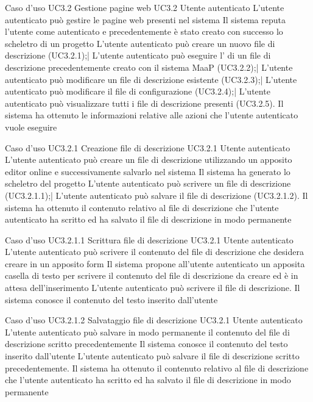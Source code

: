 \UCtitle
{Caso d'uso UC3.2}
{Gestione pagine web}
\UC
{UC3.2}
{Utente autenticato}
{L'utente autenticato può gestire le pagine web presenti nel sistema}
{Il sistema reputa l'utente come autenticato e precedentemente è stato creato con successo lo scheletro di un progetto}
\scenario
{L'utente autenticato può creare un nuovo file di descrizione (UC3.2.1);|
L'utente autenticato può eseguire l' di un file di descrizione precedentemente creato con il sistema MaaP (UC3.2.2);|
L'utente autenticato può modificare un file di descrizione esistente (UC3.2.3);|
L'utente autenticato può modificare il file di configurazione (UC3.2.4);|
L'utente autenticato può visualizzare tutti i file di descrizione presenti (UC3.2.5).
}
\post
{Il sistema ha ottenuto le informazioni relative alle azioni che l'utente autenticato vuole eseguire}


\UCtitle
{Caso d'uso UC3.2.1}
{Creazione file di descrizione}
\UC
{UC3.2.1}
{Utente autenticato}
{L'utente autenticato può creare un file di descrizione utilizzando un apposito editor online e successivamente salvarlo nel sistema}
{Il sistema ha generato lo scheletro del progetto}
\scenario
{L'utente autenticato può scrivere un file di descrizione (UC3.2.1.1);|
L'utente autenticato può salvare il file di descrizione (UC3.2.1.2).
}
\post
{Il sistema ha ottenuto il contenuto relativo al file di descrizione che l'utente autenticato ha scritto ed ha salvato il file di descrizione in modo permanente}

\UCtitle
{Caso d'uso UC3.2.1.1}
{Scrittura file di descrizione}
\UC
{UC3.2.1}
{Utente autenticato}
{L'utente autenticato può scrivere il contenuto del file di descrizione che desidera creare in un apposito form}
{Il sistema propone all'utente autenticato un apposita casella di testo per scrivere il contenuto del file di descrizione da creare ed è in attesa dell'inserimento}
\scenario
{L'utente autenticato può scrivere il file di descrizione.}
\post
{Il sistema conosce il contenuto del testo inserito dall'utente}

\UCtitle
{Caso d'uso UC3.2.1.2}
{Salvataggio file di descrizione}
\UC
{UC3.2.1}
{Utente autenticato}
{L'utente autenticato può salvare in modo permanente il contenuto del file di descrizione scritto precedentemente}
{Il sistema conosce il contenuto del testo inserito dall'utente}
\scenario
{L'utente autenticato può salvare il file di descrizione scritto precedentemente.}
\post
{Il sistema ha ottenuto il contenuto relativo al file di descrizione che l'utente autenticato ha scritto ed ha salvato il file di descrizione in modo permanente}

